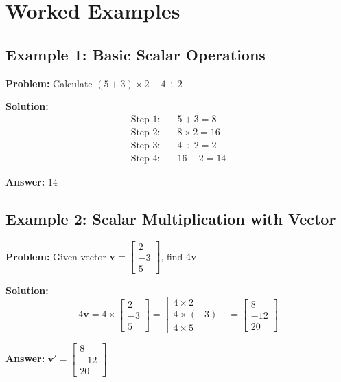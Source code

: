 \documentclass[11pt,a4paper]{article}
\begin{document}
\section{Worked Examples}

\subsection{Example 1: Basic Scalar Operations}

\textbf{Problem:} Calculate $(5 + 3) \times 2 - 4 \div 2$

\textbf{Solution:}
\begin{align*}
    \text{Step 1:} \quad & 5 + 3 = 8 \\
    \text{Step 2:} \quad & 8 \times 2 = 16 \\
    \text{Step 3:} \quad & 4 \div 2 = 2 \\
    \text{Step 4:} \quad & 16 - 2 = 14
\end{align*}

\textbf{Answer:} $14$

\subsection{Example 2: Scalar Multiplication with Vector}

\textbf{Problem:} Given vector $\mathbf{v} = \begin{bmatrix} 2 \\ -3 \\ 5 \end{bmatrix}$, find $4\mathbf{v}$

\textbf{Solution:}
\begin{equation}
    4\mathbf{v} = 4 \times \begin{bmatrix} 2 \\ -3 \\ 5 \end{bmatrix} = \begin{bmatrix} 4 \times 2 \\ 4 \times (-3) \\ 4 \times 5 \end{bmatrix} = \begin{bmatrix} 8 \\ -12 \\ 20 \end{bmatrix}
\end{equation}

\textbf{Answer:} $\mathbf{v}' = \begin{bmatrix} 8 \\ -12 \\ 20 \end{bmatrix}$
\end{document}
